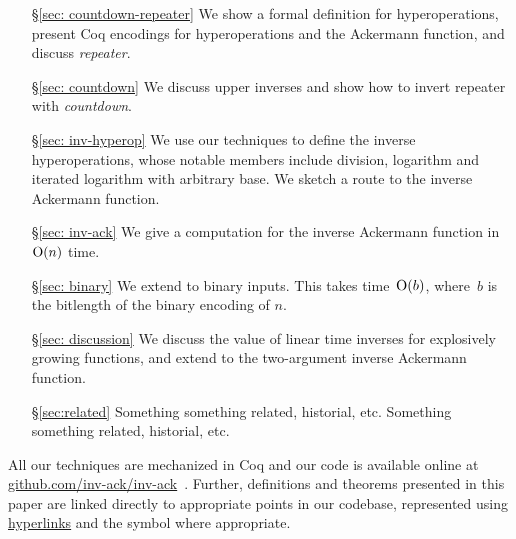 \begin{itemize}
    \item[\S\ref{sec: countdown-repeater}] We show a formal definition for hyperoperations, present Coq encodings for hyperoperations and the Ackermann function, and discuss \emph{repeater}.
    \item[\S\ref{sec: countdown}] We discuss upper inverses and show how to invert repeater with \emph{countdown}.
    \item[\S\ref{sec: inv-hyperop}] We use our techniques to define the inverse hyperoperations, whose notable members include division, logarithm and iterated logarithm with arbitrary base. We sketch a route to the inverse Ackermann function.
    \item[\S\ref{sec: inv-ack}] We give a computation for the inverse Ackermann function in $\text{O}(n)$ time.
    \item[\S\ref{sec: binary}] We extend to binary inputs. This takes time~$\text{O}(b)$, 
    where~$b$ is the bitlength of the binary encoding of $n$.
    \item[\S\ref{sec: discussion}] We discuss the value of linear time inverses for
    explosively growing functions, and extend to the two-argument inverse Ackermann function.
    \item[\S\ref{sec:related}] {\color{red}Something something related, historial, etc. Something something related, historial, etc.}

\end{itemize}
All our techniques are mechanized in Coq and our code is available
online at \href{https://github.com/inv-ack/inv-ack}{\color{blue}github.com/inv-ack/inv-ack}~\cite{inv-ack}. Further, definitions and theorems presented
in this paper are linked directly to appropriate points in our codebase,
represented using \href{https://github.com/inv-ack/inv-ack}{\color{blue}hyperlinks}
and the symbol \href{https://github.com/inv-ack/inv-ack}{\color{blue}\coq} where appropriate.


